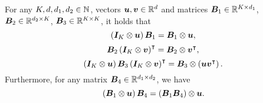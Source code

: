 \begin{lemma}\label{lem:vector_outer_KP}
    For any $K,d,d_1,d_2\in{\mathbb N}$, vectors ${\bm{u}}, {\bm{v}}\in{\mathbb R}^d$ and matrices ${\bm{B}}_1\in{\mathbb R}^{K\times d_1}$, ${\bm{B}}_2\in{\mathbb R}^{d_2\times K}$, ${\bm{B}}_3\in{\mathbb R}^{K\times K}$, it holds that
    \begin{equation*}
    \left({{\bm{I}}_K\otimes{\bm{u}}}\right){\bm{B}}_1={\bm{B}}_1\otimes{\bm{u}},
\end{equation*}
\begin{equation*}
    {\bm{B}}_2\left({{\bm{I}}_K\otimes{\bm{v}}}\right)^{\intercal}={\bm{B}}_2\otimes{\bm{v}}^{\intercal},
\end{equation*}
\begin{equation*}
    \left({{\bm{I}}_K\otimes{\bm{u}}}\right){\bm{B}}_3\left({{\bm{I}}_K\otimes{\bm{v}}}\right)^{\intercal}={\bm{B}}_3\otimes\left({{\bm{u}}{\bm{v}}^{\intercal}}\right).
\end{equation*}
Furthermore, for any matrix ${\bm{B}}_4\in{\mathbb R}^{d_1\times d_2}$, we have
    \begin{equation*}
    \left({{\bm{B}}_1\otimes{\bm{u}}}\right){\bm{B}}_4=\left({{\bm{B}}_1{\bm{B}}_4}\right)\otimes {\bm{u}}.
\end{equation*}
\end{lemma}
